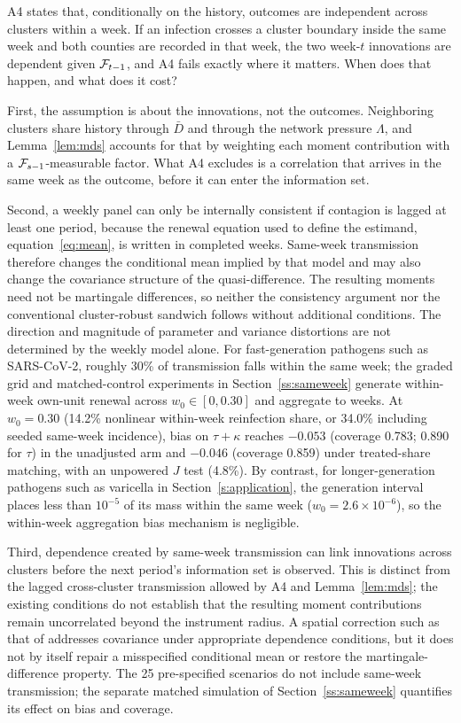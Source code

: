 A4 states that, conditionally on the history, outcomes are independent across clusters within a
week. If an infection crosses a cluster boundary inside the same week and both counties are
recorded in that week, the two week-$t$ innovations are dependent given $\mathcal{F}_{t-1}$, and A4 fails
exactly where it matters. When does that happen, and what does it cost?

First, the assumption is about the innovations, not the outcomes. Neighboring clusters share
history through $\bar D$ and through the network pressure $\Lambda$, and Lemma~\ref{lem:mds}
accounts for that by weighting each moment contribution with a $\mathcal{F}_{s-1}$-measurable factor. What
A4 excludes is a correlation that arrives in the same week as the outcome, before it can enter
the information set.

Second, a weekly panel can only be internally consistent if contagion is lagged at least one
period, because the renewal equation used to define the estimand, equation~\eqref{eq:mean}, is
written in completed weeks. Same-week transmission therefore changes the conditional mean implied
by that model and may also change the covariance structure of the quasi-difference. The resulting
moments need not be martingale differences, so neither the consistency argument nor the conventional
cluster-robust sandwich follows without additional conditions. The direction and magnitude of parameter and variance distortions are not determined by the weekly
model alone. For fast-generation pathogens such as SARS-CoV-2, roughly 30\% of transmission falls
within the same week; the graded grid and matched-control experiments in Section~\ref{ss:sameweek}
generate within-week own-unit renewal across $w_0\in[0,0.30]$ and aggregate to weeks. At $w_0=0.30$
(14.2\% nonlinear within-week reinfection share, or 34.0\% including seeded same-week incidence),
bias on $\tau+\kappa$ reaches $-0.053$ (coverage 0.783; 0.890 for $\tau$) in the unadjusted arm and
$-0.046$ (coverage 0.859) under treated-share matching, with an unpowered $J$ test (4.8\%). By
contrast, for longer-generation pathogens such as varicella in Section~\ref{s:application}, the
generation interval places less than $10^{-5}$ of its mass within the same week
($w_0=2.6\times 10^{-6}$), so the within-week aggregation bias mechanism is negligible.

Third, dependence created by same-week transmission can link innovations across clusters before
the next period's information set is observed. This is distinct from the lagged cross-cluster
transmission allowed by A4 and Lemma~\ref{lem:mds}; the existing conditions do not establish that
the resulting moment contributions remain uncorrelated beyond the instrument radius. A spatial
correction such as that of \citet{conley1999gmm} addresses covariance under appropriate dependence
conditions, but it does not by itself repair a misspecified conditional mean or restore the
martingale-difference property. The 25 pre-specified scenarios do not include same-week transmission; the separate matched
simulation of Section~\ref{ss:sameweek} quantifies its effect on bias and coverage.

